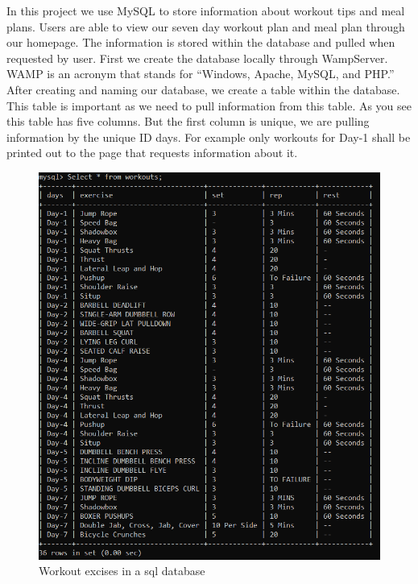 \documentclass[a4paper,12pt]{report}
\begin{document}
In this project we use MySQL to store information about workout tips and meal plans. Users are able to view our seven day workout plan and meal plan through our homepage. The information is stored within the database and pulled when requested by user.
First we create the database locally through WampServer. WAMP is an acronym that stands for “Windows, Apache, MySQL, and PHP.” After creating and naming our database, we create a table within the database. 
This table is important as we need to pull information from this table. As you see this table has five columns. But the first column is unique, we are pulling information by the unique ID days. For example only workouts for Day-1 shall be printed out to the page that requests information about it.

\begin{figure}[h]
    \begin{center}
    \includegraphics[scale=.56]{images/workouts-table.PNG}
    \caption{Workout excises in a sql database}
    \label{fig:MYSQL}
    \end{center}
\end{figure}
\end{document}
